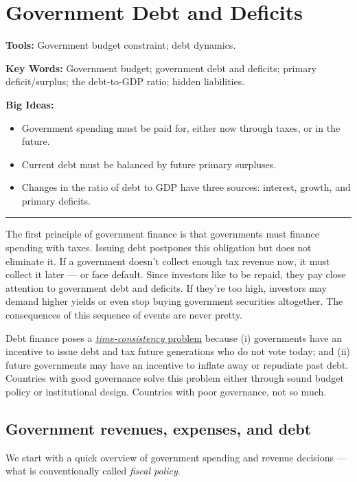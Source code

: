 \chapter{Government Debt and Deficits}\label{chp:dbdf}
\hypertarget{deficits}{}

\textbf{Tools:} Government budget constraint; debt dynamics.

\textbf{Key Words:} Government budget; government debt and deficits; primary deficit/surplus;
the debt-to-GDP ratio; hidden liabilities.

\textbf{Big Ideas:}
\vspace{-0.1in}
\begin{itemize}
\item Government spending must be paid for, either now through taxes, or in the
future.
\item Current debt must be balanced by future primary surpluses.
\item Changes in the ratio of debt to GDP have three sources:
interest, growth, and primary deficits.
\end{itemize}
\rule{\textwidth}{1pt}

The first principle of government finance is that
governments must finance spending with taxes.
Issuing debt postpones this obligation but does not eliminate it.
If a government doesn't collect enough tax revenue now,
it must collect it later --- or face default.
Since investors like to be repaid, they pay close attention
to government debt and deficits.
If they're too high, investors may demand higher yields
or even stop buying government securities altogether.
The consequences of this sequence of events are never pretty.

Debt finance poses a \hyperref[sec:time_cons]{\textit{time-consistency} problem} because
(i) governments have an incentive to issue debt and tax future
generations who do not vote today;
and (ii) future governments may have an incentive to inflate away
or repudiate past debt.
Countries with good governance solve this problem either through
sound budget policy or institutional design.
Countries with poor governance, not so much.


\section{Government revenues, expenses, and debt}

We start with a quick overview of
government spending and revenue decisions ---
what is conventionally called {\it fiscal policy\/}.

